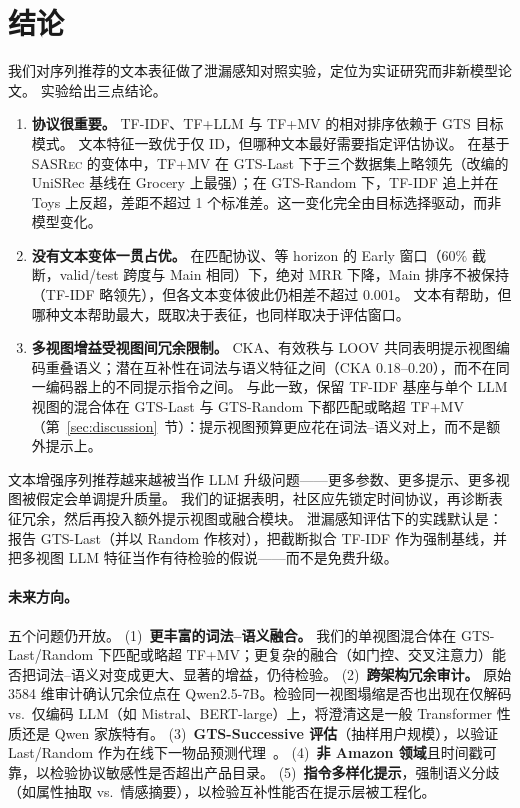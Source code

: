 \documentclass[sigconf,natbib=true,anonymous]{acmart}
\newcommand{\tfidf}{\textsc{TF-IDF}\xspace}
\newcommand{\tfllm}{\textsc{TF+LLM}\xspace}
\newcommand{\tfmv}{\textsc{TF+MV}\xspace}
\newcommand{\base}{\textsc{SASRec}\xspace}
\begin{document}
\section{结论}
\label{sec:conclusion}

我们对序列推荐的文本表征做了泄漏感知对照实验，定位为实证研究而非新模型论文。
实验给出三点结论。

\begin{enumerate}[leftmargin=*,itemsep=1pt]
\item \textbf{协议很重要。}
\tfidf、\tfllm 与 \tfmv 的相对排序依赖于 GTS 目标模式。
文本特征一致优于仅 ID，但哪种文本最好需要指定评估协议。
在基于 \base 的变体中，\tfmv 在 GTS-Last 下于三个数据集上略领先（改编的 UniSRec 基线在 Grocery 上最强）；在 GTS-Random 下，\tfidf 追上并在 Toys 上反超，差距不超过 1 个标准差。这一变化完全由目标选择驱动，而非模型变化。
\item \textbf{没有文本变体一贯占优。}
在匹配协议、等 horizon 的 Early 窗口（$60\%$ 截断，valid/test 跨度与 Main 相同）下，绝对 MRR 下降，Main 排序不被保持（\tfidf 略领先），但各文本变体彼此仍相差不超过 0.001。
文本有帮助，但哪种文本帮助最大，既取决于表征，也同样取决于评估窗口。
\item \textbf{多视图增益受视图间冗余限制。}
CKA、有效秩与 LOOV 共同表明提示视图编码重叠语义；潜在互补性在词法与语义特征之间（CKA $0.18$--$0.20$），而不在同一编码器上的不同提示指令之间。
与此一致，保留 \tfidf 基座与单个 LLM 视图的混合体在 GTS-Last 与 GTS-Random 下都匹配或略超 \tfmv（第~\ref{sec:discussion}~节）：提示视图预算更应花在词法--语义对上，而不是额外提示上。
\end{enumerate}

文本增强序列推荐越来越被当作 LLM 升级问题——更多参数、更多提示、更多视图被假定会单调提升质量。
我们的证据表明，社区应先锁定时间协议，再诊断表征冗余，然后再投入额外提示视图或融合模块。
泄漏感知评估下的实践默认是：报告 GTS-Last（并以 Random 作核对），把截断拟合 \tfidf 作为强制基线，并把多视图 LLM 特征当作有待检验的假说——而不是免费升级。

\paragraph{未来方向。}
五个问题仍开放。
(1)~\textbf{更丰富的词法--语义融合。} 我们的单视图混合体在 GTS-Last/Random 下匹配或略超 \tfmv；更复杂的融合（如门控、交叉注意力）能否把词法--语义对变成更大、显著的增益，仍待检验。
(2)~\textbf{跨架构冗余审计。} 原始 3584 维审计确认冗余位点在 Qwen2.5-7B。检验同一视图塌缩是否也出现在仅解码 vs.\ 仅编码 LLM（如 Mistral、BERT-large）上，将澄清这是一般 Transformer 性质还是 Qwen 家族特有。
(3)~\textbf{GTS-Successive 评估}（抽样用户规模），以验证 Last/Random 作为在线下一物品预测代理~\cite{gusak2025time}。
(4)~\textbf{非 Amazon 领域}且时间戳可靠，以检验协议敏感性是否超出产品目录。
(5)~\textbf{指令多样化提示}，强制语义分歧（如属性抽取 vs.\ 情感摘要），以检验互补性能否在提示层被工程化。
\end{document}
